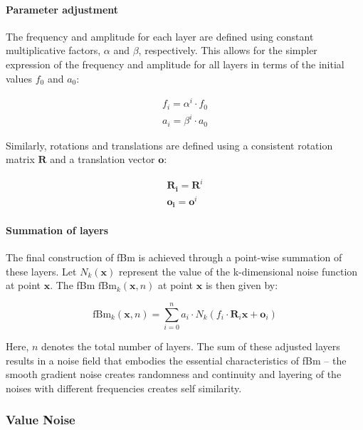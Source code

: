 \paragraph{Parameter adjustment}

The frequency and amplitude for each layer are defined using constant multiplicative factors, $\alpha$ and $\beta$, respectively. This allows for the simpler expression of the frequency and amplitude for all layers in terms of the initial values $f_0$ and $a_0$:

\begin{align}
f_i = \alpha^i \cdot f_0 \\
a_i = \beta^i \cdot a_0
\end{align}

Similarly, rotations and translations are defined using a consistent rotation matrix $\mathbf{R}$ and a translation vector $\mathbf{o}$:

\begin{align}
\mathbf{R_i} = \mathbf{R}^i \\
\mathbf{o_i} = \mathbf{o}^i
\end{align}

\paragraph{Summation of layers}

The final construction of fBm is achieved through a point-wise summation of these layers. Let $N_k(\mathbf{x})$ represent the value of the k-dimensional noise function at point $\mathbf{x}$. The fBm $\text{fBm}_k(\mathbf{x}, n)$ at point $\mathbf{x}$ is then given by:

\begin{equation}
    \text{fBm}_k(\mathbf{x}, n) = \sum_{i=0}^{n} a_i \cdot N_k(f_i \cdot \mathbf{R}_i\mathbf{x} + \mathbf{o}_i)
\end{equation}

Here, $n$ denotes the total number of layers. The sum of these adjusted layers results in a noise field that embodies the essential characteristics of fBm -- the smooth gradient noise creates randomness and continuity and layering of the noises with different frequencies creates self similarity.

\subsubsection{Value Noise}
\label{value noise}


